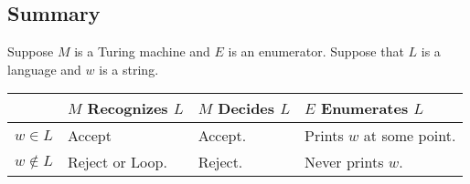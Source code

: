 \documentclass[letterpaper]{article}
\begin{document}
\subsection{Summary}
Suppose $M$ is a Turing machine and $E$ is an enumerator. Suppose that $L$ is a language and $w$ is a string.
\begin{center}
    \begin{tabular}{p{0.5in}|p{1.5in}|p{1.5in}|p{1.5in}}
            & $M$ Recognizes $L$ & $M$ Decides $L$ & $E$ Enumerates $L$ \\ 
        \hline 
        $w \in L$ & Accept & Accept. & Prints $w$ at some point. \\ 
        $w \notin L$ & Reject or Loop. & Reject. & Never prints $w$. 
    \end{tabular}
\end{center}
\end{document}
